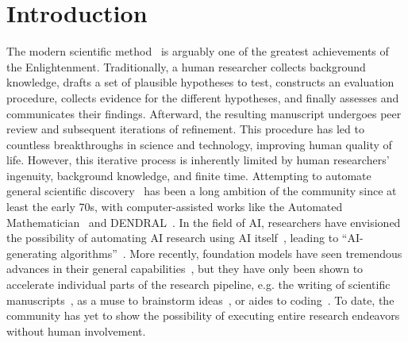 \documentclass[11pt, a4paper]{include/gdm_format}
\begin{document}
\section{Introduction}
\label{sec:introduction}
%
The modern scientific method~\citep{chalmers2013thing, jevons1877principles, dewey1910we} is arguably one of the greatest achievements of the Enlightenment.
Traditionally, a human researcher collects background knowledge, drafts a set of plausible hypotheses to test, constructs an evaluation procedure, collects evidence for the different hypotheses, and finally assesses and communicates their findings. Afterward, the resulting manuscript undergoes peer review and subsequent iterations of refinement.
This procedure has led to countless breakthroughs in science and technology, improving human quality of life.
However, this iterative process is inherently limited by human researchers' ingenuity, background knowledge, and finite time.
Attempting to automate general scientific discovery~\citep{waltz2009automating,langley2024integrated, langley1987scientific} has been a long ambition of the community since at least the early 70s, with computer-assisted works like the Automated Mathematician~\citep{lenat1977automated, lenat1984and} and DENDRAL~\citep{buchanan1981dendral}.
In the field of AI, researchers have envisioned the possibility of automating AI research using AI itself~\citep{schmidhuber1991curious,schmidhuber2010formal,schmidhuber2010artificial,schmidhuber2012, ghahramani2015probabilistic}, leading to ``AI-generating algorithms''~\citep{clune2019ai}.
More recently, foundation models have seen tremendous advances in their general capabilities~\citep{gpt4,geminiteam2023gemini,claude3,llama3}, but they have only been shown to accelerate individual parts of the research pipeline, e.g. the writing of scientific manuscripts~\citep{altmae2023artificial,ifargan2024autonomousllmdrivenresearchdata,majumder2024discoverybenchdatadrivendiscoverylarge,dinu2024symbolicaiframeworklogicbasedapproaches}, as a muse to brainstorm ideas~\citep{girotra2023ideas,wang2024scimonscientificinspirationmachines, baek2024researchagentiterativeresearchidea}, or aides to coding~\citep{aider}.
To date, the community has yet to show the possibility of executing entire research endeavors without human involvement.
\end{document}
